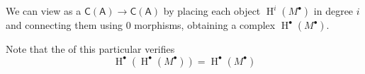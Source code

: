 \documentclass[../main.tex]{subfiles}
\begin{document}
\begin{remark}
  We can view  as a  \(\mathsf{C}(\mathsf{A}) \to \mathsf{C}(\mathsf{A})\) by placing each  object \(\operatorname{H}^{i}(M^{\bullet})\) in degree \(i\) and connecting them using 0 morphisms, obtaining a complex \(\operatorname{H}^{\bullet}(M^{\bullet})\).

  Note that the  of this particular  verifies
  \begin{equation*}
    \operatorname{H}^{\bullet}(\operatorname{H}^{\bullet}(M^{\bullet})) = \operatorname{H}^{\bullet}(M^{\bullet})
  \end{equation*}
\end{remark}
\end{document}
